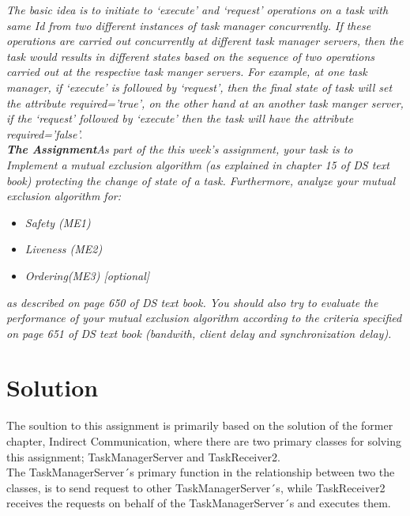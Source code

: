 \textit{The basic idea is to initiate to ‘execute’ and ‘request’ operations on a task with same Id from two different instances of task manager concurrently. If these operations are carried out concurrently at different task manager servers, then the task would results in different states based on the sequence of two operations carried out at the respective task manger servers.  For example, at one task manager, if ‘execute’ is followed by ‘request’, then the final state of task will set the attribute required=’true’, on the other hand at an another task manger server, if the ‘request’ followed by ‘execute’ then the task will have the attribute required=’false’.}\\

\textit{\textbf{The Assignment}\newline As part of the this week’s assignment, your task is to Implement a mutual exclusion algorithm (as explained in chapter 15 of DS text book) protecting the change of state of a task. Furthermore, analyze your  mutual exclusion algorithm for:}

\begin{itemize}
\item \textit{Safety (ME1)}
\item \textit{Liveness (ME2)}
\item \textit{Ordering(ME3) [optional]}
\end{itemize}

\textit{as described on page 650 of DS text book. You should also try to evaluate the performance of your mutual exclusion algorithm according to the criteria specified on page 651 of DS text book (bandwith, client delay and synchronization delay).}

\section{Solution}
\label{MutualExclusion_solution}
The soultion to this assignment is primarily based on the solution of the former chapter, Indirect Communication, where there are two primary classes for solving this assignment; TaskManagerServer and TaskReceiver2. \\

The TaskManagerServer´s primary function in the relationship between two the classes, is to send request to other TaskManagerServer´s, while TaskReceiver2 receives the requests on behalf of the TaskManagerServer´s and executes them. \\

